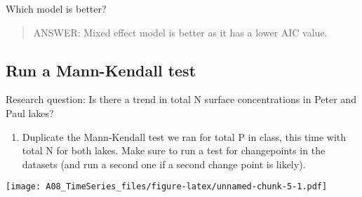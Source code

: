 \documentclass[]{article}
\newenvironment{Shaded}{\begin{snugshade}}{\end{snugshade}}
\newcommand{\KeywordTok}[1]{\textcolor[rgb]{0.13,0.29,0.53}{\textbf{#1}}}
\newcommand{\DataTypeTok}[1]{\textcolor[rgb]{0.13,0.29,0.53}{#1}}
\newcommand{\DecValTok}[1]{\textcolor[rgb]{0.00,0.00,0.81}{#1}}
\newcommand{\StringTok}[1]{\textcolor[rgb]{0.31,0.60,0.02}{#1}}
\newcommand{\CommentTok}[1]{\textcolor[rgb]{0.56,0.35,0.01}{\textit{#1}}}
\newcommand{\OperatorTok}[1]{\textcolor[rgb]{0.81,0.36,0.00}{\textbf{#1}}}
\newcommand{\NormalTok}[1]{#1}
\providecommand{\tightlist}{%
  \setlength{\itemsep}{0pt}\setlength{\parskip}{0pt}}
\begin{document}
Which model is better?

\begin{quote}
ANSWER: Mixed effect model is better as it has a lower AIC value.
\end{quote}

\subsection{Run a Mann-Kendall test}\label{run-a-mann-kendall-test}

Research question: Is there a trend in total N surface concentrations in
Peter and Paul lakes?

\begin{enumerate}
\def\labelenumi{\arabic{enumi}.}
\setcounter{enumi}{3}
\tightlist
\item
  Duplicate the Mann-Kendall test we ran for total P in class, this time
  with total N for both lakes. Make sure to run a test for changepoints
  in the datasets (and run a second one if a second change point is
  likely).
\end{enumerate}

\begin{Shaded}
\end{Shaded}

\texttt{[image: A08\_TimeSeries\_files/figure-latex/unnamed-chunk-5-1.pdf]}
\end{document}
